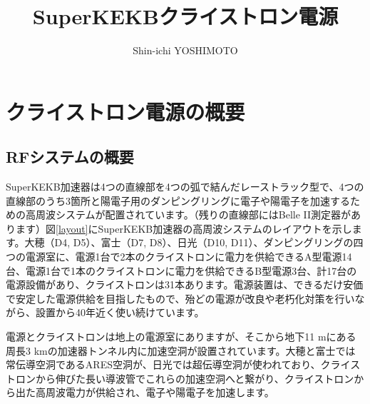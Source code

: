 \documentclass[10pt,a4paper,book,openany]{jlreq}
\theoremstyle{definition}
\begin{document}
\title{SuperKEKBクライストロン電源}
\author{Shin-ichi YOSHIMOTO}
\maketitle
\tableofcontents
\clearpage


\chapter{クライストロン電源の概要}

\section{RFシステムの概要}

SuperKEKB加速器は4つの直線部を4つの弧で結んだレーストラック型で、4つの直線部のうち3箇所と陽電子用のダンピングリングに電子や陽電子を加速するための高周波システムが配置されています。（残りの直線部にはBelle II測定器があります）図\ref{layout}にSuperKEKB加速器の高周波システムのレイアウトを示します。大穂（D4, D5）、富士（D7, D8）、日光（D10, D11）、ダンピングリングの四つの電源室に、電源1台で2本のクライストロンに電力を供給できるA型電源14台、電源1台で1本のクライストロンに電力を供給できるB型電源3台、計17台の電源設備があり、クライストロンは31本あります。電源装置は、できるだけ安価で安定した電源供給を目指したもので、殆どの電源が改良や老朽化対策を行いながら、設置から40年近く使い続けています。

電源とクライストロンは地上の電源室にありますが、そこから地下11 mにある周長3 kmの加速器トンネル内に加速空洞が設置されています。大穂と富士では常伝導空洞であるARES空洞が、日光では超伝導空洞が使われており、クライストロンから伸びた長い導波管でこれらの加速空洞へと繋がり、クライストロンから出た高周波電力が供給され、電子や陽電子を加速します。
\end{document}
